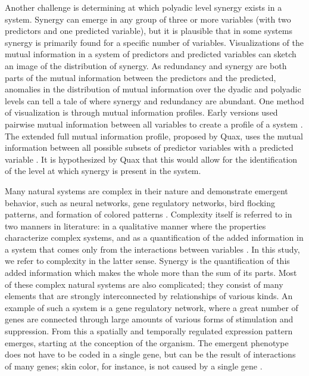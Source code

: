 \documentclass[../main.tex]{subfiles}
\begin{document}
Another challenge is determining at which polyadic level synergy exists in a system.
Synergy can emerge in any group of three or more variables (with two predictors and one predicted variable), but it is plausible that in some systems synergy is primarily found for a specific number of variables.
Visualizations of the mutual information in a system of predictors and predicted variables can sketch an image of the distribution of synergy.
As redundancy and synergy are both parts of the mutual information between the predictors and the predicted, anomalies in the distribution of mutual information over the dyadic and polyadic levels can tell a tale of where synergy and redundancy are abundant.
One method of visualization is through mutual information profiles.
Early versions used pairwise mutual information between all variables to create a profile of a system \cite{bar2013computationally}.
The extended full mutual information profile, proposed by Quax, uses the mutual information between all possible subsets of predictor variables with a predicted variable \cite{QuaxPersonal}.
It is hypothesized by Quax that this would allow for the identification of the level at which synergy is present in the system.

Many natural systems are complex in their nature and demonstrate emergent behavior, such as neural networks, gene regulatory networks, bird flocking patterns, and formation of colored patterns \cite{choi2001supply, gat1999synergy, kondo2010reaction, liang2008gene}.
Complexity itself is referred to in two manners in literature: in a qualitative manner where the properties characterize complex systems, and as a quantification of the added information in a system that comes only from the interactions between variables \cite{bar2004multiscale}.
In this study, we refer to complexity in the latter sense.
Synergy is the quantification of this added information which makes the whole more than the sum of its parts.
Most of these complex natural systems are also complicated; they consist of many elements that are strongly interconnected by relationships of various kinds.
An example of such a system is a gene regulatory network, where a great number of genes are connected through large amounts of various forms of stimulation and suppression.
From this a spatially and temporally regulated expression pattern emerges, starting at the conception of the organism.
The emergent phenotype does not have to be coded in a single gene, but can be the result of interactions of many genes; skin color, for instance, is not caused by a single gene \cite{barsh2003controls}.
\end{document}
